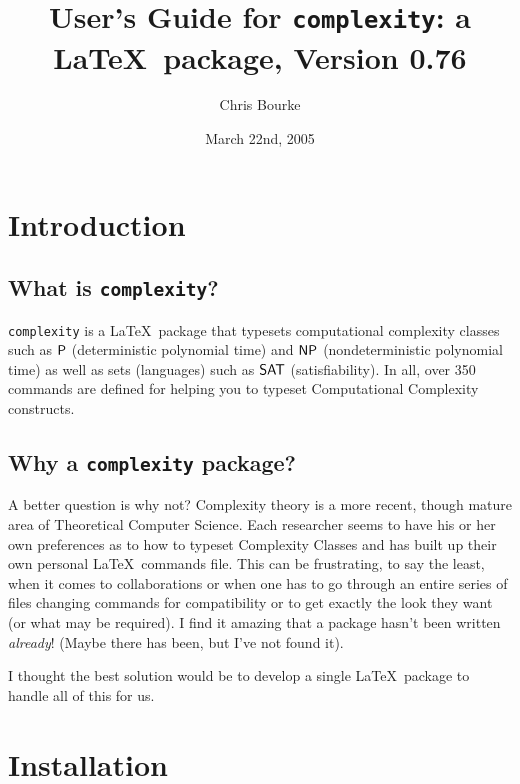 \documentclass{ltxdoc}
\def\complexityversion{0.76}
\begin{document}
\title{User's Guide for \texttt{complexity}: a \LaTeX\ package, Version \complexityversion}
\author{Chris Bourke\\
}
\date{March 22nd, 2005}

\maketitle

\tableofcontents

\section{Introduction}

\subsection{What is \texttt{complexity}?}

\texttt{complexity} is a \LaTeX\ package that typesets computational
complexity classes such as $\P$ (deterministic polynomial time) and
$\NP$ (nondeterministic polynomial time) as well as sets (languages)
such as $\SAT$ (satisfiability).  In all, over 350 commands are
defined for helping you to typeset Computational Complexity
constructs.

\subsection{Why a \texttt{complexity} package?}

A better question is why not?  Complexity theory is a more recent,
though mature area of Theoretical Computer Science.  Each researcher
seems to have his or her own preferences as to how to typeset
Complexity Classes and has built up their own personal \LaTeX\
commands file. This can be frustrating, to say the least, when it
comes to collaborations or when one has to go through an entire
series of files changing commands for compatibility or to get
exactly the look they want (or what may be required).  I find it
amazing that a package hasn't been written \emph{already}!  (Maybe
there has been, but I've not found it).

I thought the best solution would be to develop a single \LaTeX\
package to handle all of this for us.

\section{Installation}
\end{document}
